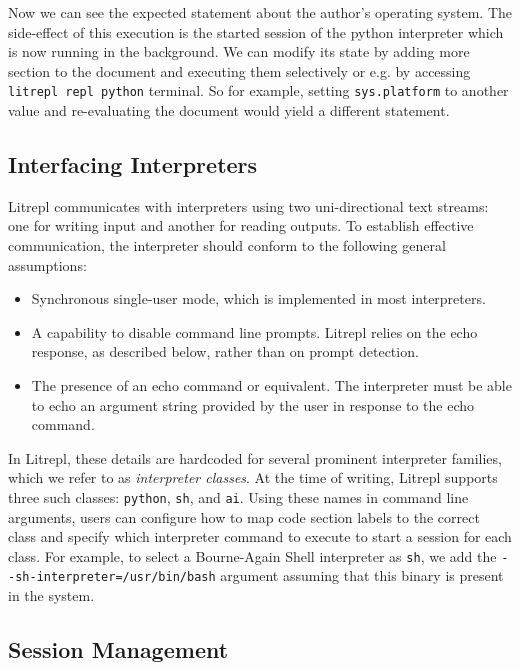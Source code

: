 \documentclass[letterpaper,12pt,twocolumn]{article}
\begin{document}
Now we can see the expected statement about the author's operating system.  The
side-effect of this execution is the started session of the python interpreter
which is now running in the background. We can modify its state by adding more
section to the document and executing them selectively or e.g. by accessing
\verb|litrepl repl python| terminal. So for example, setting \verb|sys.platform|
to another value and re-evaluating the document would yield a different
statement.


\subsection{Interfacing Interpreters}

Litrepl communicates with interpreters using two uni-directional text streams:
one for writing input and another for reading outputs. To establish effective
communication, the interpreter should conform to the following general
assumptions:

\begin{itemize}
  \item Synchronous single-user mode, which is implemented in most interpreters.
  \item A capability to disable command line prompts. Litrepl relies on the echo
        response, as described below, rather than on prompt detection.
  \item The presence of an echo command or equivalent. The interpreter must be
        able to echo an argument string provided by the user in response to the
        echo command.
\end{itemize}

In Litrepl, these details are hardcoded for several prominent interpreter
families, which we refer to as \textit{interpreter classes}. At the time of
writing, Litrepl supports three such classes: \texttt{python}, \texttt{sh}, and
\texttt{ai}. Using these names in command line arguments, users can configure
how to map code section labels to the correct class and specify which
interpreter command to execute to start a session for each class. For example,
to select a Bourne-Again Shell interpreter as \verb|sh|, we add the
\verb|--sh-interpreter=/usr/bin/bash| argument assuming that this binary is
present in the system.

\subsection{Session Management}
\end{document}
